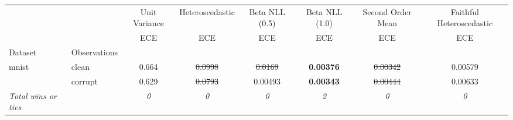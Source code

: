 \begin{tabular}{ll|c|c|c|c|c|c}
\toprule
{} & {} & {Unit Variance} & {Heteroscedastic} & {Beta NLL (0.5)} & {Beta NLL (1.0)} & {Second Order Mean} & {Faithful Heteroscedastic} \\
{} & {} & {ECE} & {ECE} & {ECE} & {ECE} & {ECE} & {ECE} \\
{Dataset} & {Observations} & {} & {} & {} & {} & {} & {} \\
\midrule
\multirow[t]{2}{*}{mnist} & clean & 0.664 & \sout{0.0998} & \sout{0.0169} & \textbf{0.00376} & \sout{0.00342} & 0.00579 \\
 & corrupt & 0.629 & \sout{0.0793} & 0.00493 & \textbf{0.00343} & \sout{0.00444} & 0.00633 \\
\textit{{Total wins or ties}} &  & \textit{0} & \textit{0} & \textit{0} & \textit{2} & \textit{0} & \textit{0} \\
\bottomrule
\end{tabular}
